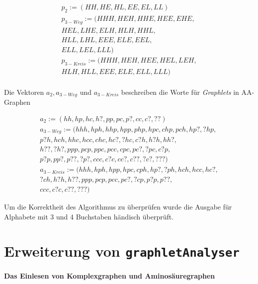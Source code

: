 \documentclass{report}
\begin{document}
\begin{subequations}
\begin{align*}
p_2 :=       (HH, HE, HL, EE, EL, LL) \\
p_{3-Weg}   := (HHH, HEH, HHE, HEE, EHE, \\
                HEL, LHE, ELH, HLH, HHL, \\
                HLL, LHL, EEE, ELE, EEL, \\
                ELL, LEL, LLL) \\
p_{3-Kreis} := (HHH, HEH, HEE, HEL, LEH, \\
                HLH, HLL, EEE, ELE, ELL, LLL) \\
\end{align*}
\end{subequations}

Die Vektoren $a_2, a_{3-Weg}$ und $a_{3-Kreis}$ beschreiben die Worte f\"ur \textit{Graphlets} in AA-Graphen 

\begin{subequations}
\begin{align*}
a_2 :=         (hh, hp, hc, h?, pp, pc, p?, cc, c?, ??) \\ 
a_{3-Weg} :=   (hhh, hph, hhp, hpp, php, hpc, chp, pch, hp?, ?hp,\\
                p?h, hch, hhc, hcc, chc, hc?, ?hc ,c?h, h?h, hh?, \\
                h??, ?h?, ppp, pcp, ppc, pcc, cpc, pc?, ?pc, c?p, \\
                p?p, pp?, p??, ?p?, ccc, c?c, cc?, c??, ?c?, ???) \\
a_{3-Kreis} := (hhh, hph, hpp, hpc, cph, hp?, ?ph, hch, hcc, hc?, \\
                ?ch, h?h, h??, ppp, pcp, pcc, pc?, ?cp, p?p, p??, \\
                ccc, c?c, c??, ???)
\end{align*}
\end{subequations}


Um die Korrektheit des Algorithmus zu \"uberpr\"ufen wurde die Ausgabe f\"ur Alphabete mit 3 und 4 Buchstaben h\"andisch \"uberpr\"uft.


\section{Erweiterung von \texttt{graphletAnalyser}}

\paragraph{Das Einlesen von Komplexgraphen und Aminos\"auregraphen}
\end{document}

